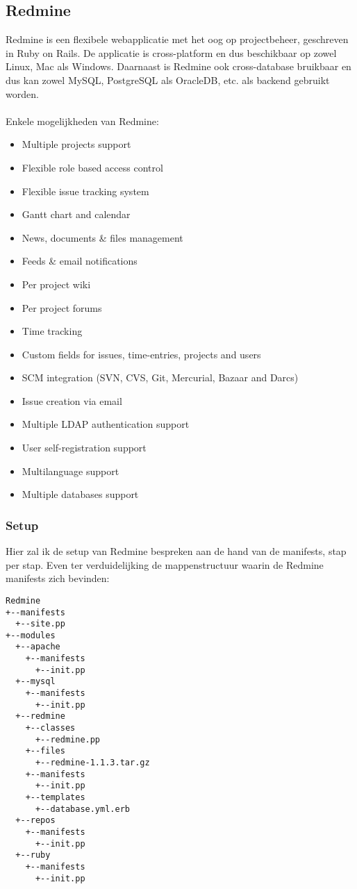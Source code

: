 \subsection{Redmine}
Redmine is een flexibele webapplicatie met het oog op projectbeheer, geschreven in Ruby on Rails. De applicatie is cross-platform en dus beschikbaar op zowel Linux, Mac als Windows. Daarnaast is Redmine ook cross-database bruikbaar en dus kan zowel MySQL, PostgreSQL als OracleDB, etc. als backend gebruikt worden.\\\\
%
Enkele mogelijkheden van Redmine:
\begin{itemize}
    \item Multiple projects support
    \item Flexible role based access control
    \item Flexible issue tracking system
    \item Gantt chart and calendar
    \item News, documents \& files management
    \item Feeds \& email notifications
    \item Per project wiki
    \item Per project forums
    \item Time tracking
    \item Custom fields for issues, time-entries, projects and users
    \item SCM integration (SVN, CVS, Git, Mercurial, Bazaar and Darcs)
    \item Issue creation via email
    \item Multiple LDAP authentication support
    \item User self-registration support
    \item Multilanguage support
    \item Multiple databases support
\end{itemize}

\subsubsection{Setup}
Hier zal ik de setup van Redmine bespreken aan de hand van de manifests, stap per stap. Even ter verduidelijking de mappenstructuur waarin de Redmine manifests zich bevinden:
%
\begin{code}
\begin{lstlisting}
Redmine
+--manifests
  +--site.pp
+--modules
  +--apache
    +--manifests
      +--init.pp
  +--mysql
    +--manifests
      +--init.pp
  +--redmine
    +--classes
      +--redmine.pp
    +--files
      +--redmine-1.1.3.tar.gz
    +--manifests
      +--init.pp
    +--templates
      +--database.yml.erb
  +--repos
    +--manifests
      +--init.pp
  +--ruby
    +--manifests
      +--init.pp
\end{lstlisting}
\end{code}
